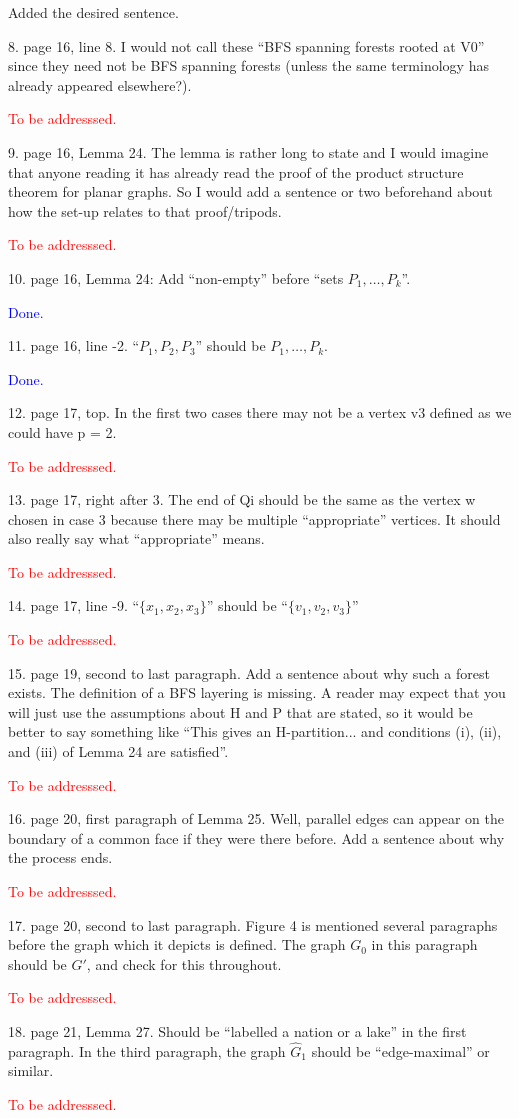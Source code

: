 \documentclass[12pt]{article}
\newcommand{\done}{\textcolor{blue}{Done.}}
\newcommand{\tba}{\textcolor{red}{To be addresssed.}}
\newenvironment{response}{\color{blue}}{}
\begin{document}
\begin{response}
	Added the desired sentence.
\end{response}

8. page 16, line 8. I would not call these “BFS spanning forests rooted
at V0” since they need not be BFS spanning forests (unless the same
terminology has already appeared elsewhere?).

\tba

9. page 16, Lemma 24. The lemma is rather long to state and I would
imagine that anyone reading it has already read the proof of the product
structure theorem for planar graphs. So I would add a sentence or two
beforehand about how the set-up relates to that proof/tripods.

\tba

10. page 16, Lemma 24: Add “non-empty” before “sets $P_1,\dots,P_k$”.

\done

11. page 16, line -2. “$P_1, P_2, P_3$” should be $P_1,\dots,P_k$.

\done

12. page 17, top. In the first two cases there may not be a vertex v3 defined
as we could have p = 2.

\tba

13. page 17, right after 3. The end of Qi should be the same as the vertex w
chosen in case 3 because there may be multiple “appropriate” vertices.
It should also really say what “appropriate” means.

\tba

14. page 17, line -9. “$\{x_1, x_2, x_3\}$” should be “$\{v_1, v_2, v_3\}$”

\tba

15. page 19, second to last paragraph. Add a sentence about why such
a forest exists. The definition of a BFS layering is missing. A reader
may expect that you will just use the assumptions about H and P
that are stated, so it would be better to say something like “This gives
an H-partition... and conditions (i), (ii), and (iii) of Lemma 24 are
satisfied”.

\tba

16. page 20, first paragraph of Lemma 25. Well, parallel edges can appear
on the boundary of a common face if they were there before. Add a
sentence about why the process ends.

\tba

17. page 20, second to last paragraph. Figure 4 is mentioned several paragraphs before the graph which it depicts is defined. The graph $G_0$ in
this paragraph should be $G'$, and check for this throughout.

\tba

18. page 21, Lemma 27. Should be “labelled a nation or a lake” in the
first paragraph. In the third paragraph, the graph $\hat{G}_1$ should be “edge-maximal” or similar.

\tba
\end{document}
